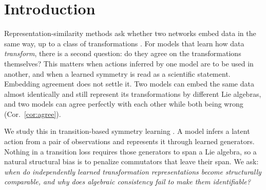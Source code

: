 \section{Introduction}\label{sec:intro}
Representation-similarity methods ask whether two networks embed data in the same way, up to a class of
transformations \citep{kornblith2019similarity,williams2021generalized,moschella2023relative}. For models that learn
how data \emph{transform}, there is a second question: do they agree on the transformations themselves? This matters
when actions inferred by one model are to be used in another, and when a learned symmetry is read as a scientific
statement. Embedding agreement does not settle it. Two models can embed the same data almost identically and still
represent its transformations by different Lie algebras, and two models can agree perfectly with each other while
both being wrong (Cor.~\ref{cor:agree}).

We study this in transition-based symmetry learning \citep{park2022learning,keurti2023homomorphism,yang2024latent}. A
model infers a latent action from a pair of observations and represents it through learned generators. Nothing in a
transition loss requires those generators to span a Lie algebra, so a natural structural bias is to penalize
commutators that leave their span. We ask:
\emph{when do independently learned transformation representations become structurally comparable, and why does
algebraic consistency fail to make them identifiable?}

